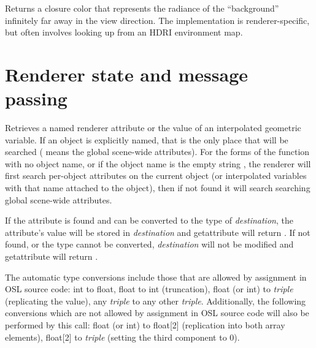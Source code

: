 \documentclass[11pt,letterpaper]{book}
\def\colorclosure{{\cf closure color}\xspace}
\begin{document}
\apiitem{\colorclosure\ {\ce background} ( )}
Returns a \colorclosure that represents the radiance of the
``background'' infinitely far away in the view direction.  The
implementation is renderer-specific, but often involves looking
up from an HDRI environment map.
\apiend


\newpage
\section{Renderer state and message passing}
\label{sec:stdlib:state}

Retrieves a named renderer attribute or the value of an interpolated
geometric variable.
If an object is explicitly named, that is the only place that will be
searched ( means the global scene-wide attributes).  For the
forms of the function with no object name, or if the object name is the
empty string \qkw{}, the renderer will first search
per-object attributes on the current object (or interpolated variables
with that name attached to the object), then if not found it will search
searching global scene-wide attributes.  

If the attribute is found and can be converted to the type of
\emph{destination}, the attribute's value will be stored in
\emph{destination} and {\cf getattribute} will return {}.  If not
found, or the type cannot be converted, \emph{destination} will not be
modified and {\cf getattribute} will return {}.

The automatic type conversions include those that are allowed by
assignment in OSL source code: {\cf int} to {\cf float}, {\cf float} to
{\cf int} (truncation), {\cf float} (or {\cf int}) to \emph{triple}
(replicating the value), any \emph{triple} to any other \emph{triple}.
Additionally, the following conversions which are not allowed by
assignment in OSL source code will also be performed by this call: 
{\cf float} (or {\cf int}) to {\cf float[2]} (replication into both
array elements), {\cf float[2]} to \emph{triple} (setting the third
component to 0).
\end{document}
